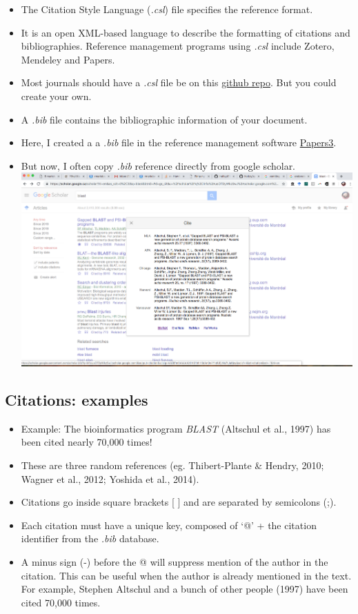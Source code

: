 \documentclass[]{article}
\begin{document}
\begin{itemize}
\item
  The Citation Style Language (\emph{.csl}) file specifies the reference
  format.
\item
  It is an open XML-based language to describe the formatting of
  citations and bibliographies. Reference management programs using
  \emph{.csl} include Zotero, Mendeley and Papers.
\item
  Most journals should have a \emph{.csl} file be on this
  \href{https://github.com/citation-style-language/styles}{github repo}.
  But you could create your own.
\item
  A \emph{.bib} file contains the bibliographic information of your
  document.
\item
  Here, I created a a \emph{.bib} file in the reference management
  software \href{https://www.readcube.com/papers/mac}{Papers3}.
\item
  But now, I often copy \emph{.bib} reference directly from google
  scholar.\\
  \includegraphics[width=5.20833in,height=\textheight]{../figures/gs.png}
\end{itemize}

\hypertarget{citations-examples}{%
\subsection{Citations: examples}\label{citations-examples}}

\begin{itemize}
\item
  Example: The bioinformatics program \emph{BLAST} (Altschul et al.,
  1997) has been cited nearly 70,000 times!
\item
  These are three random references (eg. Thibert-Plante \& Hendry, 2010;
  Wagner et al., 2012; Yoshida et al., 2014).
\item
  Citations go inside square brackets {[} {]} and are separated by
  semicolons (;).
\item
  Each citation must have a unique key, composed of `@' + the citation
  identifier from the \emph{.bib} database.
\item
  A minus sign (-) before the @ will suppress mention of the author in
  the citation. This can be useful when the author is already mentioned
  in the text. For example, Stephen Altschul and a bunch of other people
  (1997) have been cited 70,000 times.
\end{itemize}
\end{document}
